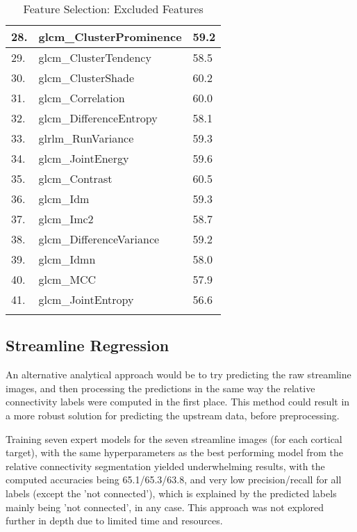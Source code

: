 {\begin{longtable}[H]{|l|l|l|}
28. & glcm\_ClusterProminence & 59.2 \\ \hline
29. & glcm\_ClusterTendency & 58.5 \\ \hline
30. & glcm\_ClusterShade & 60.2 \\ \hline
31. & glcm\_Correlation & 60.0 \\ \hline
32. & glcm\_DifferenceEntropy & 58.1 \\ \hline
33. & glrlm\_RunVariance & 59.3 \\ \hline
34. & glcm\_JointEnergy & 59.6 \\ \hline
35. & glcm\_Contrast & 60.5 \\ \hline
36. & glcm\_Idm & 59.3 \\ \hline
37. & glcm\_Imc2 & 58.7 \\ \hline
38. & glcm\_DifferenceVariance & 59.2 \\ \hline
39. & glcm\_Idmn & 58.0 \\ \hline
40. & glcm\_MCC & 57.9 \\ \hline
41. & glcm\_JointEntropy & 56.6 \\ \hline
\caption{Feature Selection: Excluded Features}
\label{tab:sbf}
\end{longtable}
}

\subsection{Streamline Regression}

An alternative analytical approach would be to try predicting the raw streamline images, and then processing the predictions in the same way the relative connectivity labels were computed in the first place. This method could result in a more robust solution for predicting the upstream data, before preprocessing.\par
Training seven expert models for the seven streamline images (for each cortical target), with the same hyperparameters as the best performing model from the relative connectivity segmentation yielded underwhelming results, with the computed accuracies being 65.1/65.3/63.8, and very low precision/recall for all labels (except the ’not connected’), which is explained by the predicted labels mainly being ’not connected’, in any case. This approach was not explored further in depth due to limited time and resources.




